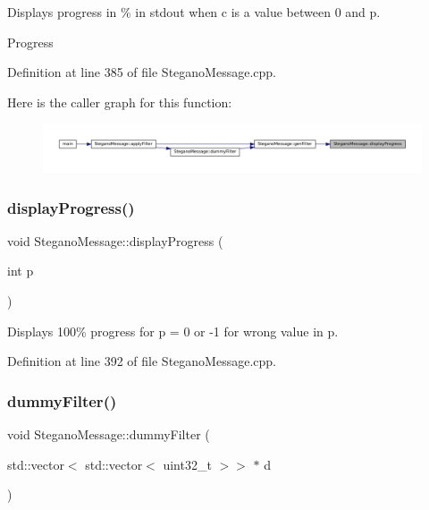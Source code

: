 Displays progress in \% in stdout when c is a value between 0 and p. 

Progress 

Definition at line 385 of file Stegano\+Message.\+cpp.

Here is the caller graph for this function\+:\nopagebreak
\begin{figure}[H]
\begin{center}
\leavevmode
\includegraphics[width=350pt]{classSteganoMessage_a50936bb2352eaaa1112280c2ac3ca2d5_icgraph}
\end{center}
\end{figure}
\mbox{\label{classSteganoMessage_aa6e24f6ed5afcf38dcba28fb91a74d21}} 
\subsubsection{\texorpdfstring{displayProgress()}{displayProgress()}\hspace{0.1cm}{\footnotesize\ttfamily [2/2]}}
{\footnotesize\ttfamily void Stegano\+Message\+::display\+Progress (\begin{DoxyParamCaption}\item[{int}]{p }\end{DoxyParamCaption})\hspace{0.3cm}{\ttfamily [private]}}



Displays 100\% progress for p = 0 or -\/1 for wrong value in p. 



Definition at line 392 of file Stegano\+Message.\+cpp.

\mbox{\label{classSteganoMessage_a1a26242c2e6d146cba1ad6831ab60ba7}} 
\subsubsection{\texorpdfstring{dummyFilter()}{dummyFilter()}}
{\footnotesize\ttfamily void Stegano\+Message\+::dummy\+Filter (\begin{DoxyParamCaption}\item[{std\+::vector$<$ std\+::vector$<$ uint32\+\_\+t $>$$>$ $\ast$}]{d }\end{DoxyParamCaption})\hspace{0.3cm}{\ttfamily [private]}}



